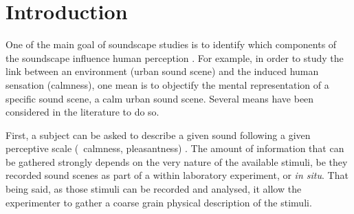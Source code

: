 \documentclass[twoside,twocolumn]{article}
\begin{document}
\setlength{\parindent}{5ex}

\section{Introduction}
\label{sec:intro}


One of the main goal of soundscape studies is to identify which components of the soundscape influence human perception \cite{aletta2016soundscape}. For example, in order to study the link between an environment (urban sound scene) and the induced human sensation (calmness), one mean is to objectify the mental representation of a specific sound scene, a calm urban sound scene. Several means have been considered in the literature to do so.


First, a subject can be asked to describe a given sound  following a given perceptive scale (\eg~calmness, pleasantness) \cite{axelsson2005soundscape,davies2013perception,cain2013development}. The amount of information that can be gathered strongly depends on the very nature of the available stimuli, be they recorded sound scenes as part of a within laboratory experiment, or \emph{in situ}. That being said, as those stimuli can be recorded and analysed, it allow the experimenter to gather a coarse grain physical description of the stimuli.

\end{document}
